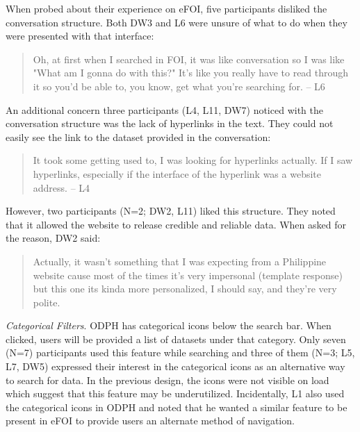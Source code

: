 \documentclass{sigchi}
\begin{document}
When probed about their experience on eFOI, five participants disliked the conversation structure. Both DW3 and L6 were unsure of what to do when they were presented with that interface:
\begin{quote}
Oh, at first when I searched in FOI, it was like conversation so I was like "What am I gonna do with this?" It's like you really have to read through it so you'd be able to, you know, get what you're searching for. -- L6
\end{quote}

An additional concern three participants (L4, L11, DW7) noticed with the conversation structure was the lack of hyperlinks in the text. They could not easily see the link to the dataset provided in the conversation: 
\begin{quote}
It took some getting used to, I was looking for hyperlinks actually. If I saw hyperlinks, especially if the interface of the hyperlink was a website address. -- L4
\end{quote}

However, two participants (N=2; DW2, L11) liked this structure. They noted that it allowed the website to release credible and reliable data. When asked for the reason, DW2 said:
\begin{quote}
  Actually, it wasn't something that I was expecting from a Philippine website cause most of the times it's very impersonal (template response) but this one its kinda more personalized, I should say, and they're very polite.
\end{quote}

\textit{Categorical Filters}. ODPH has categorical icons below the search bar. When clicked, users will be provided a list of datasets under that category. Only seven (N=7) participants used this feature while searching and three of them (N=3; L5, L7, DW5) expressed their interest in the categorical icons as an alternative way to search for data. In the previous design, the icons were not visible on load which suggest that this feature may be underutilized. Incidentally, L1 also used the categorical icons in ODPH and noted that he wanted a similar feature to be present in eFOI to provide users an alternate method of navigation.

\end{document}
